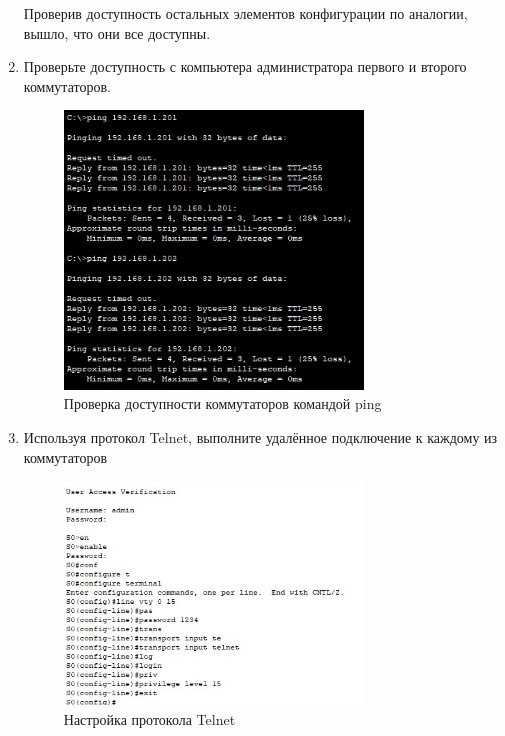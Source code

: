 \documentclass[bachelor, och, labwork]{shiza}
\begin{document}
\begin{enumerate}
    Проверив доступность остальных элементов конфигурации по аналогии, вышло, что они все доступны.

    \item Проверьте доступность с компьютера администратора первого и второго коммутаторов.

    \begin{figure}[H]
        \centering      %
        \includegraphics[width=0.75\textwidth]{11}
        \caption{Проверка доступности коммутаторов командой ping}
        \label{fig:image1}
    \end{figure}

    \item Используя протокол Telnet, выполните удалённое подключение к каждому из коммутаторов
    
    \begin{figure}[H]
        \centering      %
        \includegraphics[width=0.75\textwidth]{12}
        \caption{Настройка протокола Telnet}
        \label{fig:image1}
    \end{figure}


\end{enumerate}
\end{document}

